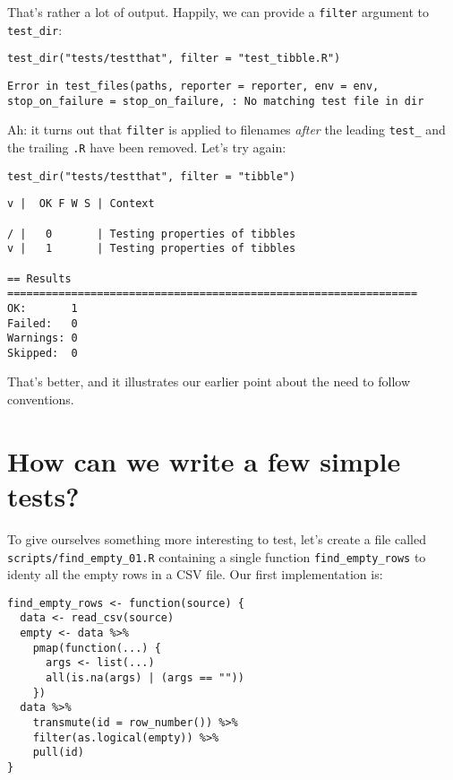 \noindent
That's rather a lot of output.
Happily,
we can provide a \texttt{filter} argument to \texttt{test\_dir}:

\begin{lstlisting}
test_dir("tests/testthat", filter = "test_tibble.R")
\end{lstlisting}

\begin{lstlisting}
Error in test_files(paths, reporter = reporter, env = env, stop_on_failure = stop_on_failure, : No matching test file in dir
\end{lstlisting}

\noindent
Ah:
it turns out that \texttt{filter} is applied to filenames
\emph{after} the leading \texttt{test\_} and the trailing \texttt{.R} have been removed.
Let's try again:

\begin{lstlisting}
test_dir("tests/testthat", filter = "tibble")
\end{lstlisting}

\begin{lstlisting}
v |  OK F W S | Context

/ |   0       | Testing properties of tibbles
v |   1       | Testing properties of tibbles

== Results ================================================================
OK:       1
Failed:   0
Warnings: 0
Skipped:  0
\end{lstlisting}

\noindent
That's better,
and it illustrates our earlier point about the need to follow conventions.

\section{How can we write a few simple tests?}\label{testerror-simple}

To give ourselves something more interesting to test,
let's create a file called \texttt{scripts/find\_empty\_01.R}
containing a single function \texttt{find\_empty\_rows} to identy all the empty rows in a CSV file.
Our first implementation is:

\begin{lstlisting}
find_empty_rows <- function(source) {
  data <- read_csv(source)
  empty <- data %>%
    pmap(function(...) {
      args <- list(...)
      all(is.na(args) | (args == ""))
    })
  data %>%
    transmute(id = row_number()) %>%
    filter(as.logical(empty)) %>%
    pull(id)
}
\end{lstlisting}

